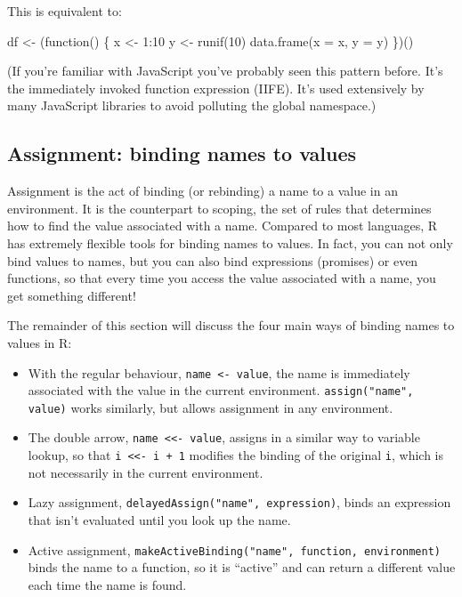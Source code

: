 \documentclass[oneside]{book}
\newenvironment{Shaded}{}{}
\newcommand{\KeywordTok} [1]{\textcolor[rgb]{0.00,0.44,0.13}{{#1}}}
\newcommand{\DataTypeTok}[1]{\textcolor[rgb]{0.56,0.13,0.00}{{#1}}}
\newcommand{\DecValTok}  [1]{\textcolor[rgb]{0.25,0.63,0.44}{{#1}}}
\newcommand{\StringTok}  [1]{\textcolor[rgb]{0.25,0.44,0.63}{{#1}}}
\newcommand{\NormalTok}  [1]{{#1}}
\begin{document}
This is equivalent to:

\begin{Shaded}
\begin{Highlighting}[]
\NormalTok{df <-}\StringTok{ }\NormalTok{(function() \{}
  \NormalTok{x <-}\StringTok{ }\DecValTok{1}\NormalTok{:}\DecValTok{10}
  \NormalTok{y <-}\StringTok{ }\KeywordTok{runif}\NormalTok{(}\DecValTok{10}\NormalTok{)}
  \KeywordTok{data.frame}\NormalTok{(}\DataTypeTok{x =} \NormalTok{x, }\DataTypeTok{y =} \NormalTok{y)}
\NormalTok{\})()}
\end{Highlighting}
\end{Shaded}

(If you're familiar with JavaScript you've probably seen this pattern
before. It's the immediately invoked function expression (IIFE). It's
used extensively by many JavaScript libraries to avoid polluting the
global namespace.)

\subsection{Assignment: binding names to values}\label{binding}

Assignment is the act of binding (or rebinding) a name to a value in an
environment. It is the counterpart to scoping, the set of rules that
determines how to find the value associated with a name. Compared to
most languages, R has extremely flexible tools for binding names to
values. In fact, you can not only bind values to names, but you can also
bind expressions (promises) or even functions, so that every time you
access the value associated with a name, you get something different!

The remainder of this section will discuss the four main ways of binding
names to values in R:

\begin{itemize}
\item
  With the regular behaviour, \texttt{name \textless{}- value}, the name
  is immediately associated with the value in the current environment.
  \texttt{assign("name", value)} works similarly, but allows assignment
  in any environment.
\item
  The double arrow, \texttt{name \textless{}\textless{}- value}, assigns
  in a similar way to variable lookup, so that
  \texttt{i \textless{}\textless{}- i + 1} modifies the binding of the
  original \texttt{i}, which is not necessarily in the current
  environment.
\item
  Lazy assignment, \texttt{delayedAssign("name", expression)}, binds an
  expression that isn't evaluated until you look up the name.
\item
  Active assignment,
  \texttt{makeActiveBinding("name", function, environment)} binds the
  name to a function, so it is ``active'' and can return a different
  value each time the name is found.
\end{itemize}
\end{document}
